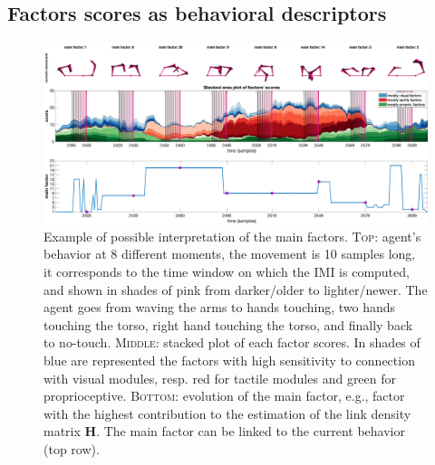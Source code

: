 \subsection{Factors scores as behavioral descriptors}
\begin{figure}[h!]
    \centering
    \includegraphics[width=.99\textwidth]{fig/factors_example_time.png}
    \caption{Example of possible interpretation of the main factors. \textsc{Top}: agent's behavior at 8 different moments, the movement is 10 samples long, it corresponds to the time window on which the IMI is computed, and shown in shades of pink from darker/older to lighter/newer. The agent goes from waving the arms to hands touching, two hands touching the torso, right hand touching the torso, and finally back to no-touch. \textsc{Middle}: stacked plot of each factor scores. In shades of blue are represented the factors with high sensitivity to connection with visual modules, resp. red for tactile modules and green for proprioceptive. \textsc{Bottom}: evolution of the main factor, e.g., factor with the highest contribution to the estimation of the link density matrix $\bm{H}$. The main factor can be linked to the current behavior (top row).}
    \label{fig:factors_time}
\end{figure}

